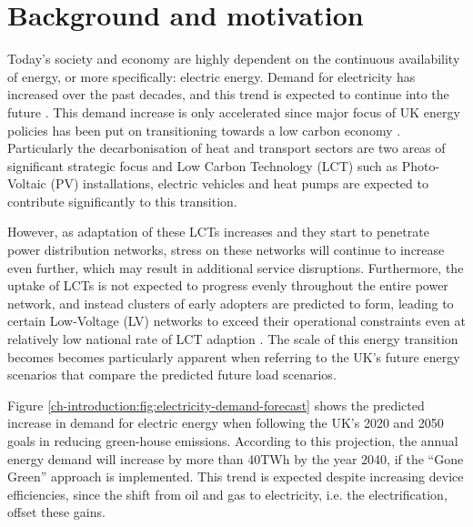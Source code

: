 \section{Background and motivation}
\label{ch-introduction:sec:background}


Today's society and economy are highly dependent on the continuous availability of energy, or more specifically: electric energy.
Demand for electricity has increased over the past decades, and this trend is expected to continue into the future \cite{HMGovernment2009}.
This demand increase is only accelerated since major focus of UK energy policies has been put on transitioning towards a low carbon economy \cite{RoyalAcademyofEngineering2010}.
Particularly the decarbonisation of heat and transport sectors are two areas of significant strategic focus and Low Carbon Technology (LCT) such as Photo-Voltaic (PV) installations, electric vehicles and heat pumps are expected to contribute significantly to this transition.

However, as adaptation of these LCTs increases and they start to penetrate power distribution networks, stress on these networks will continue to increase even further, which may result in additional service disruptions.
Furthermore, the uptake of LCTs is not expected to progress evenly throughout the entire power network, and instead clusters of early adopters are predicted to form, leading to certain Low-Voltage (LV) networks to exceed their operational constraints even at relatively low national rate of LCT adaption \cite{Poghosyan2014}.
The scale of this energy transition becomes becomes particularly apparent when referring to the UK's future energy scenarios that compare the predicted future load scenarios.



Figure \ref{ch-introduction:fig:electricity-demand-forecast} shows the predicted increase in demand for electric energy when following the UK's 2020 and 2050 goals in reducing green-house emissions.
According to this projection, the annual energy demand will increase by more than 40TWh by the year 2040, if the ``Gone Green'' approach is implemented.
This trend is expected despite increasing device efficiencies, since the shift from oil and gas to electricity, i.e. the electrification, offset these gains.




